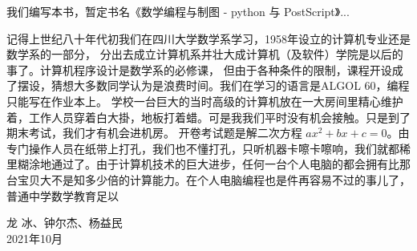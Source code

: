 \documentclass[main.tex]{subfiles}
\begin{document}
我们编写本书，暂定书名《数学编程与制图 - python 与 PostScript》...

记得上世纪八十年代初我们在四川大学数学系学习，1958年设立的计算机专业还是数学系的一部分，
分出去成立计算机系并壮大成计算机（及软件）学院是以后的事了。计算机程序设计是数学系的必修课，
但由于各种条件的限制，课程开设成了摆设，猜想大多数同学认为是浪费时间。我们在学习的语言是ALGOL 60，编程只能写在作业本上。
学校一台巨大的当时高级的计算机放在一大房间里精心维护着，工作人员穿着白大掛，地板打着蜡。可是我我们平时没有机会接触。只是到了期末考试，我们才有机会进机房。
开卷考试题是解二次方程 $ax^2+bx+c = 0$。由专门操作人员在纸带上打孔，我们也不懂打孔，只听机器卡嚓卡嚓响，我们就都稀里糊涂地通过了。由于计算机技术的巨大进步，任何一台个人电脑的都会拥有比那台宝贝大不是知多少倍的计算能力。在个人电脑编程也是件再容易不过的事儿了，普通中学数学教育足以

\begin{flushright}
龙 冰、钟尔杰、杨益民\\
2021年10月
\end{flushright}
\end{document}
